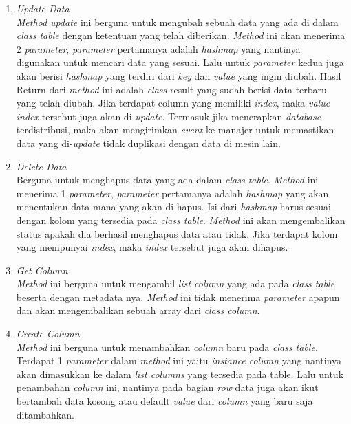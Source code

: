 \begin{enumerate}
  
	\item \emph{Update Data} \\
  \emph{Method} \emph{update} ini berguna untuk mengubah sebuah data yang ada di dalam \emph{class 
  table} dengan ketentuan yang telah diberikan. \emph{Method} ini akan menerima 2 
  \emph{parameter}, \emph{parameter} pertamanya adalah \emph{hashmap} yang nantinya digunakan untuk 
  mencari data yang sesuai. Lalu untuk \emph{parameter} kedua juga akan berisi 
  \emph{hashmap} yang terdiri dari \emph{key} dan \emph{value} yang ingin diubah. Hasil Return dari 
  \emph{method} ini adalah \emph{class} result yang sudah berisi data terbaru yang telah 
  diubah. Jika terdapat column yang memiliki \emph{index}, maka \emph{value} \emph{index} tersebut 
  juga akan di \emph{update}. Termasuk jika menerapkan \emph{database} terdistribusi, maka akan 
  mengirimkan \emph{event} ke manajer untuk memastikan data yang di-\emph{update} tidak 
  duplikasi dengan data di mesin lain.

  
	\item \emph{Delete Data} \\
  Berguna untuk menghapus data yang ada dalam \emph{class table}. \emph{Method} ini menerima 1 
  \emph{parameter}, \emph{parameter} pertamanya adalah \emph{hashmap} yang akan menentukan data mana 
  yang akan di hapus. Isi dari \emph{hashmap} harus sesuai dengan kolom yang tersedia 
  pada \emph{class table}. \emph{Method} ini akan mengembalikan status apakah dia berhasil 
  menghapus data atau tidak. Jika terdapat kolom yang mempunyai \emph{index}, maka 
  \emph{index} tersebut juga akan dihapus.

  
	\item \emph{Get Column} \\
  \emph{Method} ini berguna untuk mengambil \emph{list column} yang ada pada \emph{class table} beserta 
  dengan metadata nya. \emph{Method} ini tidak menerima \emph{parameter} apapun dan akan 
  mengembalikan sebuah array dari \emph{class column}.
 
  
	\item \emph{Create Column} \\
  \emph{Method} ini berguna untuk menambahkan \emph{column} baru pada \emph{class table}. Terdapat 1 
  \emph{parameter} dalam \emph{method} ini yaitu \emph{instance} \emph{column} yang nantinya akan dimasukkan 
  ke dalam \emph{list columns} yang tersedia pada table. Lalu untuk penambahan \emph{column} 
  ini, nantinya pada bagian \emph{row} data juga akan ikut bertambah data kosong atau 
  default \emph{value} dari \emph{column} yang baru saja ditambahkan.
 

\end{enumerate}
